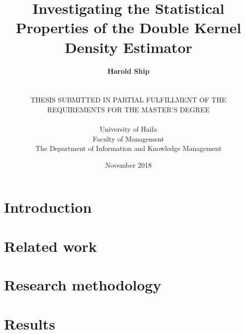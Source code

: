 \documentclass[a4paper,12pt,titlepage,oneside,openany]{book}
\title{
    \textbf{Investigating the Statistical Properties of the Double Kernel Density Estimator}
}
\author{
    \textbf{Harold Ship}\\%
    \\%
    \\%
    THESIS SUBMITTED IN PARTIAL FULFILLMENT OF THE\\%
    REQUIREMENTS FOR THE MASTER'S DEGREE\\%
    \\%
    University of Haifa\\%
    Faculty of Management\\%
    The Department of Information and Knowledge Management
}
\date{November 2018}
\begin{document}
\lstset{language=R}

\frontmatter                            %
\doublespacing
\maketitle                              %

\cleardoublepage


\cleardoublepage

%

\singlespacing                          %
\tableofcontents                        %
\cleardoublepage


\cleardoublepage

\listoftables
\cleardoublepage
\listoffigures
\printglossaries
\cleardoublepage


\mainmatter                             %


\onehalfspacing
\chapter{Introduction}
\label{ch:introduction}


\chapter{Related work}
\label{ch:related}


\chapter{Research methodology}
\label{ch:method}


\chapter{Results}
\label{ch:results}

\end{document}
